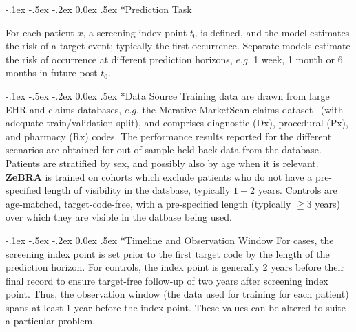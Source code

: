 \documentclass[onecolumn, compsoc,11pt]{IEEEtran}
\makeatletter
\def\zebra{\textbf{ZeBRA}\xspace}
\renewcommand\paragraph{\@startsection {section}{1}{\z@}
  {-.1ex \@plus -.5ex \@minus -.2ex}
  {0.0ex \@plus.5ex}
  {\fontsize{11}{10}\selectfont\bfseries\itshape\sffamily}}
\def\zebra{\textbf{ZeBRA}\xspace}
\def\zcor{\zebra}
\makeatother
\begin{document}
\paragraph*{Prediction Task }

For each patient \( x \), a screening index point \( t_0 \) is defined, and the model estimates the risk of a  target event;  typically the first occurrence. Separate models estimate the risk of occurrence at different prediction horizons, $e.g.$  1 week, 1 month or 6 months in future post-\( t_0 \).

\paragraph*{Data Source} Training data are drawn from large EHR and claims databases, $e.g.$ the Merative MarketScan claims dataset~\cite{hansen2017truven} (with adequate train/validation split), and comprises diagnostic (Dx), procedural (Px), and pharmacy (Rx) codes. The performance results reported for the different scenarios are obtained for out-of-sample held-back data from the database.  Patients are stratified by sex, and possibly also by age when it is relevant. \zcor is trained on cohorts which exclude patients who do not have a pre-specified length of visibility in the datsbase, typically $1-2$ years. Controls are age-matched, target-code-free, with a pre-specified length (typically $\geqq 3 $ years) over which they are visible in the datbase being used.

\paragraph*{Timeline and Observation Window} For cases, the screening index point is set  prior to the first target code by the length of the prediction horizon. For controls, the index point is generally  2 years before their final record to ensure target-free follow-up of two years after screening index point. Thus, the observation window (the data used for training for each patient) spans at least 1 year  before the index point. These values can be altered to suite a particular problem.
\end{document}
